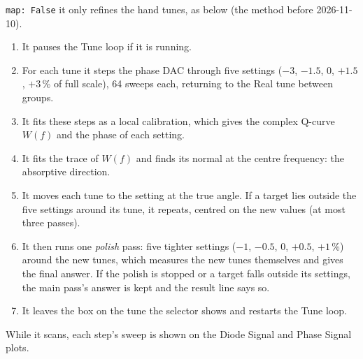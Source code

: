 \documentclass[11pt]{article}
\newcommand{\code}[1]{\texttt{\begingroup\def\_{\textunderscore\allowbreak}#1\endgroup}}
\begin{document}
\code{map: False} it only refines the hand tunes, as below (the method before 2026-11-10).
\begin{enumerate}
\item It pauses the Tune loop if it is running.
\item For each tune it steps the phase DAC through five settings ($-3$, $-1.5$, $0$, $+1.5$, $+3$\,\% of full
  scale), 64 sweeps each, returning to the Real tune between groups.
\item It fits these steps as a local calibration, which gives the complex Q-curve $W(f)$ and the phase of
  each setting.
\item It fits the trace of $W(f)$ and finds its normal at the centre frequency: the absorptive direction.
\item It moves each tune to the setting at the true angle. If a target lies outside the five settings around
  its tune, it repeats, centred on the new values (at most three passes).
\item It then runs one \emph{polish} pass: five tighter settings ($-1$, $-0.5$, $0$, $+0.5$, $+1$\,\%) around the new
  tunes, which measures the new tunes themselves and gives the final answer. If the polish is stopped or a
  target falls outside its settings, the main pass's answer is kept and the result line says so.
\item It leaves the box on the tune the selector shows and restarts the Tune loop.
\end{enumerate}
While it scans, each step's sweep is shown on the Diode Signal and Phase Signal plots.
\end{document}
